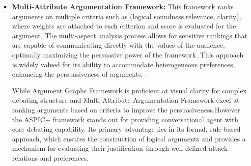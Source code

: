 \documentclass[conference]{IEEEtran}
\begin{document}
\begin{itemize}
    \item \textbf{Multi-Attribute Argumentation Framework:} 
    This framework ranks arguments on multiple criteria such as (logical soundness,relevance, clarity), where weights are attached to each criterion and score is evaluated for the argument. The multi-aspect analysis process allows for sensitive rankings that are capable of communicating directly with the values of the audience, optimally maximizing the persuasive power of the framework. This approach is widely valued for its ability to accommodate heterogeneous preferences, enhancing the persuasiveness of arguments. \cite{engelmann2022argumentation}.

    While Argument Graphs Framework is proficient at visual clarity for complex debating structure and Multi-Attribute Argumentation Framework excel at ranking arguments based on criteria to improve the persuasiveness.However the ASPIC+ framework stands out for providing conversational agent with core debating capability. Its primary advantage lies in its formal, rule-based approach, which ensures the construction of logical arguments and provides a mechanism for evaluating their justification through well-defined attack relations and preferences.
    
\end{itemize}
\end{document}
